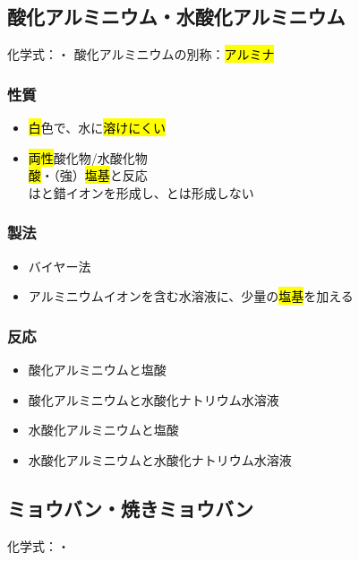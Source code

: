 \subsection{酸化アルミニウム・水酸化アルミニウム}
化学式：\hl{}・\hl{}
酸化アルミニウムの別称：\hl{アルミナ}
\subsubsection{性質}
\begin{itemize}
  \item \hl{白}色で、水に\hl{溶けにくい}\\
  \item \hl{両性}酸化物/水酸化物\\
        \hl{酸}・（強）\hl{塩基}と反応\\
        は\hl{}と錯イオンを形成し、\hl{}とは形成しない
\end{itemize}
\subsubsection{製法}
\begin{itemize}
  \item バイヤー法
  \item アルミニウムイオンを含む水溶液に、少量の\hl{塩基}を加える \\
\end{itemize}
\subsubsection{反応}
\begin{itemize}
  \item 酸化アルミニウムと塩酸\\
  \item 酸化アルミニウムと水酸化ナトリウム水溶液\\
  \item 水酸化アルミニウムと塩酸\\
  \item 水酸化アルミニウムと水酸化ナトリウム水溶液\\
\end{itemize}
\subsection{ミョウバン・焼きミョウバン}
化学式：\hl{}・\hl{}
